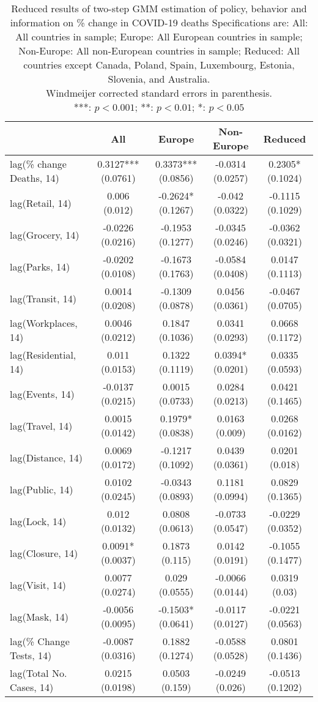\begin{table}[ht]
\centering
\begingroup\small
\begin{tabular}{lcccc}
  \toprule
 & All & Europe & Non-Europe & Reduced \\ 
  \midrule
lag(\% change Deaths, 14) & 0.3127*** (0.0761) & 0.3373*** (0.0856) & -0.0314 (0.0257) & 0.2305* (0.1024) \\ 
  lag(Retail, 14) & 0.006 (0.012) & -0.2624* (0.1267) & -0.042 (0.0322) & -0.1115 (0.1029) \\ 
  lag(Grocery, 14) & -0.0226 (0.0216) & -0.1953 (0.1277) & -0.0345 (0.0246) & -0.0362 (0.0321) \\ 
  lag(Parks, 14) & -0.0202 (0.0108) & -0.1673 (0.1763) & -0.0584 (0.0408) & 0.0147 (0.1113) \\ 
  lag(Transit, 14) & 0.0014 (0.0208) & -0.1309 (0.0878) & 0.0456 (0.0361) & -0.0467 (0.0705) \\ 
  lag(Workplaces, 14) & 0.0046 (0.0212) & 0.1847 (0.1036) & 0.0341 (0.0293) & 0.0668 (0.1172) \\ 
  lag(Residential, 14) & 0.011 (0.0153) & 0.1322 (0.1119) & 0.0394* (0.0201) & 0.0335 (0.0593) \\ 
  lag(Events, 14) & -0.0137 (0.0215) & 0.0015 (0.0733) & 0.0284 (0.0213) & 0.0421 (0.1465) \\ 
  lag(Travel, 14) & 0.0015 (0.0142) & 0.1979* (0.0838) & 0.0163 (0.009) & 0.0268 (0.0162) \\ 
  lag(Distance, 14) & 0.0069 (0.0172) & -0.1217 (0.1092) & 0.0439 (0.0361) & 0.0201 (0.018) \\ 
  lag(Public, 14) & 0.0102 (0.0245) & -0.0343 (0.0893) & 0.1181 (0.0994) & 0.0829 (0.1365) \\ 
  lag(Lock, 14) & 0.012 (0.0132) & 0.0808 (0.0613) & -0.0733 (0.0547) & -0.0229 (0.0352) \\ 
  lag(Closure, 14) & 0.0091* (0.0037) & 0.1873 (0.115) & 0.0142 (0.0191) & -0.1055 (0.1477) \\ 
  lag(Visit, 14) & 0.0077 (0.0274) & 0.029 (0.0555) & -0.0066 (0.0144) & 0.0319 (0.03) \\ 
  lag(Mask, 14) & -0.0056 (0.0095) & -0.1503* (0.0641) & -0.0117 (0.0127) & -0.0221 (0.0563) \\ 
  lag(\% Change Tests, 14) & -0.0087 (0.0316) & 0.1882 (0.1274) & -0.0588 (0.0528) & 0.0801 (0.1436) \\ 
  lag(Total No. Cases, 14) & 0.0215 (0.0198) & 0.0503 (0.159) & -0.0249 (0.026) & -0.0513 (0.1202) \\ 
   \bottomrule
\end{tabular}
\endgroup
\caption{Reduced results of two-step GMM estimation of policy, behavior and information on \% change in COVID-19 deaths Specifications are: All: All countries in sample; Europe: All European countries in sample; Non-Europe: All non-European countries in sample; Reduced: All countries except Canada, Poland, Spain, Luxembourg, Estonia, Slovenia, and Australia. \\ Windmeijer corrected standard errors in parenthesis. \\ ***: $p<0.001$; **: $p< 0.01$; *: $p< 0.05$} 
\label{tab_results:deaths_reduced}
\end{table}

